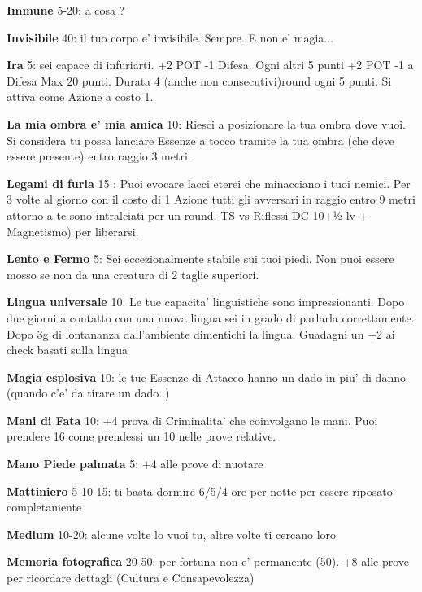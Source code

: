 \documentclass[a4paper,11pt,twoside,openany]{book}
\begin{document}
\textbf{Immune} 5-20: a cosa ?

\textbf{Invisibile} 40: il tuo corpo e' invisibile. Sempre. E non e' magia...

\textbf{Ira} 5: sei capace di infuriarti. +2 POT -1 Difesa. Ogni altri 5 punti +2 POT -1 a Difesa Max 20 punti. Durata 4 (anche non consecutivi)round ogni 5 punti. Si attiva come Azione a costo 1.

\textbf{La mia ombra e' mia amica} 10: Riesci a posizionare la tua ombra dove vuoi. Si considera tu possa lanciare Essenze a tocco tramite la tua ombra (che deve essere presente) entro raggio 3 metri.

\textbf{Legami di furia} 15 : Puoi evocare lacci eterei che minacciano i tuoi nemici. Per 3 volte al giorno con il costo di 1 Azione tutti gli avversari in raggio entro 9 metri attorno a te sono intralciati per un round. TS vs Riflessi DC 10+½ lv + Magnetismo) per liberarsi.

\textbf{Lento e Fermo} 5: Sei eccezionalmente stabile sui tuoi piedi. Non puoi essere mosso se non da una creatura di 2 taglie superiori.

\textbf{Lingua universale} 10. Le tue capacita' linguistiche sono impressionanti. Dopo due giorni a contatto con una nuova lingua sei in grado di parlarla correttamente. Dopo 3g di lontananza dall'ambiente dimentichi la lingua. Guadagni un +2 ai check basati sulla lingua

\textbf{Magia esplosiva} 10: le tue Essenze di Attacco hanno un dado in piu' di danno (quando c'e' da tirare un dado..)

\textbf{Mani di Fata} 10: +4 prova di Criminalita' che coinvolgano le mani. Puoi prendere 16 come prendessi un 10 nelle prove relative. 

\textbf{Mano Piede palmata} 5: +4 alle prove di nuotare

\textbf{Mattiniero} 5-10-15: ti basta dormire 6/5/4 ore per notte
per essere riposato completamente

\textbf{Medium} 10-20: alcune volte lo vuoi tu, altre volte ti cercano loro

\textbf{Memoria fotografica} 20-50: per fortuna non e' permanente (50). +8 alle prove per ricordare dettagli (Cultura e Consapevolezza)
\end{document}
